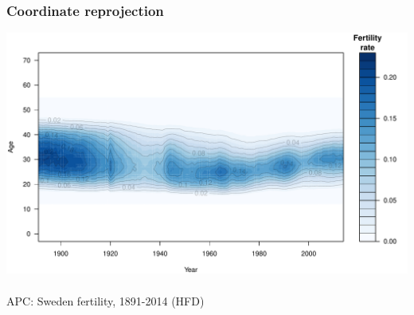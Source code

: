 \documentclass[20pt]{beamer}
\begin{document}





\begin{frame}
\frametitle{Coordinate reprojection}
\includegraphics[scale=.9]{Figures/FertAPC.pdf}\\
$~$\\
APC: Sweden fertility, 1891-2014 (HFD)
\end{frame}
\end{document}
